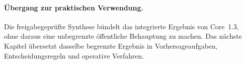 \begingroup
\small

\endgroup

\paragraph{Übergang zur praktischen Verwendung.}
Die freigabegeprüfte Synthese bündelt das integrierte Ergebnis von Core~1.3,
ohne daraus eine unbegrenzte öffentliche Behauptung zu machen. Das nächste
Kapitel übersetzt dasselbe begrenzte Ergebnis in Vorhersageaufgaben,
Entscheidungsregeln und operative Verfahren.

